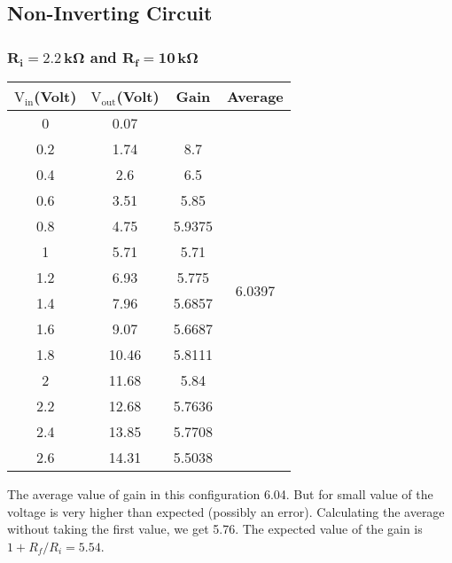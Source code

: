 \documentclass[12pt]{article}
\begin{document}
\subsection{Non-Inverting Circuit}
\subsubsection{$\mathbf{R_i = 2.2\, k \Omega}$ and $\mathbf{R_f = 10\, k \Omega}$}
\begin{table}[H]
	\centering
	\begin{tabular}{|c|c|c|c|}
		\hline
		$\mathrm{V_{in}}$(Volt) & $\mathrm{V_{out}}$(Volt) & Gain             & Average                            \\ \hline \hline
		0            & 0.07          &        & \multirow{14}{*}{6.0397} \\ \cline{1-3}
		0.2          & 1.74          & 8.7    &                          \\ \cline{1-3}
		0.4          & 2.6           & 6.5    &                          \\ \cline{1-3}
		0.6          & 3.51          & 5.85   &                          \\ \cline{1-3}
		0.8          & 4.75          & 5.9375 &                          \\ \cline{1-3}
		1            & 5.71          & 5.71   &                          \\ \cline{1-3}
		1.2          & 6.93          & 5.775  &                          \\ \cline{1-3}
		1.4          & 7.96          & 5.6857 &                          \\ \cline{1-3}
		1.6          & 9.07          & 5.6687 &                          \\ \cline{1-3}
		1.8          & 10.46         & 5.8111 &                          \\ \cline{1-3}
		2            & 11.68         & 5.84   &                          \\ \cline{1-3}
		2.2          & 12.68         & 5.7636 &                          \\ \cline{1-3}
		2.4          & 13.85         & 5.7708 &                          \\ \cline{1-3}
		2.6          & 14.31         & 5.5038 &                          \\ \hline
	\end{tabular}
\end{table}
The average value of gain in this configuration 6.04. But for small value of the voltage is very higher than expected (possibly an error). Calculating the average without taking the first value, we get 5.76. The expected value of the gain is $ 1 + R_f/R_i = 5.54 $. 
\end{document}

